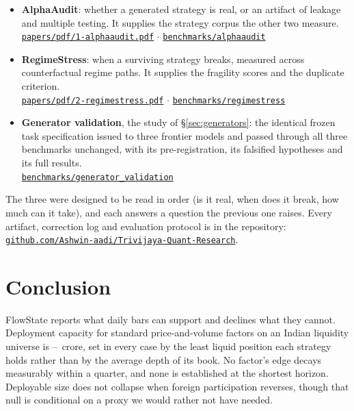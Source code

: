 \documentclass[11pt,a4paper]{article}
\begin{document}
\begin{itemize}
\item \textbf{AlphaAudit}: whether a generated strategy is real, or an artifact of leakage and multiple testing. It supplies the strategy corpus the other two measure.\\
\href{https://github.com/Ashwin-aadi/Trivijaya-Quant-Research/blob/main/papers/pdf/1-alphaaudit.pdf}%
{\texttt{papers/pdf/1-alphaaudit.pdf}} \quad$\cdot$\quad
\href{https://github.com/Ashwin-aadi/Trivijaya-Quant-Research/tree/main/benchmarks/alphaaudit}%
{\texttt{benchmarks/alphaaudit}}

\item \textbf{RegimeStress}: when a surviving strategy breaks, measured across counterfactual regime paths. It supplies the fragility scores and the duplicate criterion.\\
\href{https://github.com/Ashwin-aadi/Trivijaya-Quant-Research/blob/main/papers/pdf/2-regimestress.pdf}%
{\texttt{papers/pdf/2-regimestress.pdf}} \quad$\cdot$\quad
\href{https://github.com/Ashwin-aadi/Trivijaya-Quant-Research/tree/main/benchmarks/regimestress}%
{\texttt{benchmarks/regimestress}}
\item \textbf{Generator validation}, the study of \S\ref{sec:generators}:
the identical frozen task specification issued to three frontier models and passed
through all three benchmarks unchanged, with its pre-registration, its falsified
hypotheses and its full results.\\
\href{https://github.com/Ashwin-aadi/Trivijaya-Quant-Research/tree/main/benchmarks/generator_validation}%
{\texttt{benchmarks/generator\_validation}}
\end{itemize}

The three were designed to be read in order (is it real, when does it break, how much
can it take), and each answers a question the previous one raises. Every artifact,
correction log and evaluation protocol is in the repository:
\href{https://github.com/Ashwin-aadi/Trivijaya-Quant-Research}{\texttt{github.com/Ashwin-aadi/Trivijaya-Quant-Research}}.

\section{Conclusion}

FlowState reports what daily bars can support and declines what they cannot. Deployment capacity for
standard price-and-volume factors on an Indian liquidity universe is
\rupee\fsFactorBindingMin--\fsFactorBindingMax\ crore, set in every case by the least liquid position
each strategy holds rather than by the average depth of its book. No factor's edge decays measurably
within a quarter, and none is established at the shortest horizon. Deployable size does not collapse
when foreign participation reverses, though that null is conditional on a proxy we would rather not
have needed.
\end{document}

